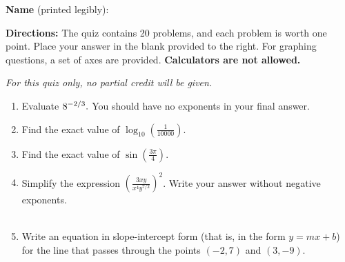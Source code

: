 \documentclass[12pt]{article}
\begin{document}
\textbf{Name} (printed legibly): \fbox{\strut\hspace{4in} }

\textbf{Directions:} The quiz contains 20 problems, and each problem is worth one point. Place your answer in the blank provided to the right. For graphing questions, a set of axes are provided. {\bf Calculators are not allowed.}%

{\em For this quiz only, no partial credit will be given.}

\begin{enumerate}
\item Evaluate ${\large{8^{-2/3}}}.$ You should have no exponents in your final answer.

\quad \hfill \underline{\hspace{2in}}
\vfill

\item Find the exact value of  $\displaystyle{\log_{10}{\left(\frac{1}{10000}\right)}}.$

\quad \hfill \underline{\hspace{2in}}
\vfill

\item Find the exact value of $\displaystyle{\sin \left( \frac{3 \pi}{4}\right)}.$

\quad \hfill \underline{\hspace{2in}}
\vfill

\item  Simplify the expression $\displaystyle{\left(\frac{3xy}{x^4y^{7/2}} \right)^2}$. Write your answer without negative exponents.\\
\quad \\

\quad \hfill \underline{\hspace{2in}}
\vfill

\item Write an equation in slope-intercept form (that is, in the form $y=mx+b$) for the line that passes through the points $(-2,7)$ and $(3,-9)$.\\

\quad \hfill \underline{\hspace{2in}}
\vfill
\newpage


\end{enumerate}
\end{document}
